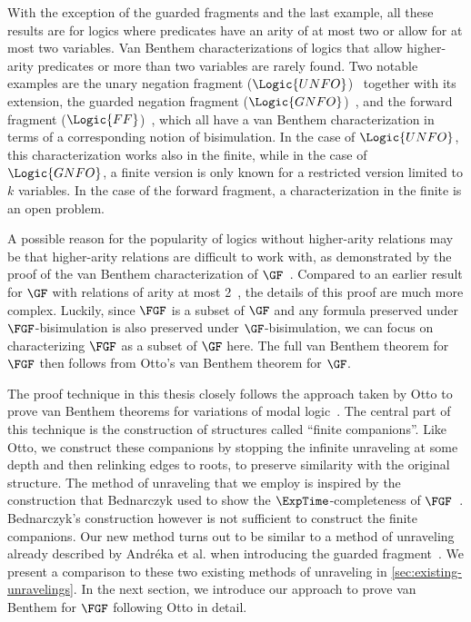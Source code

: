 With the exception of the guarded fragments and the last example, all these results are for logics where predicates have an arity of at most two or allow for at most two variables.
Van Benthem characterizations of logics that allow higher-arity predicates or more than two variables are rarely found.
Two notable examples are the unary negation fragment ($\Logic{UNFO}$)~\cite{segoufin2013} together with its extension, the guarded negation fragment ($\Logic{GNFO}$)~\cite{barany2015}, and the forward fragment ($\Logic{FF}$)~\cite{BednarczykJ22}, which all have a van Benthem characterization in terms of a corresponding notion of bisimulation.
In the case of $\Logic{UNFO}$, this characterization works also in the finite, while in the case of $\Logic{GNFO}$, a finite version is only known for a restricted version limited to $k$ variables.
In the case of the forward fragment, a characterization in the finite is an open problem.

A possible reason for the popularity of logics without higher-arity relations may be that higher-arity relations are difficult to work with, as demonstrated by the proof of the van Benthem characterization of $\GF$~\cite{Otto2012}.
Compared to an earlier result for $\GF$ with relations of arity at most 2~\cite{Otto04}, the details of this proof are much more complex.
Luckily, since $\FGF$ is a subset of $\GF$ and any formula preserved under $\FGF$-bisimulation is also preserved under $\GF$-bisimulation, we can focus on characterizing $\FGF$ as a subset of $\GF$ here.
The full van Benthem theorem for $\FGF$ then follows from Otto's van Benthem theorem for $\GF$.

The proof technique in this thesis closely follows the approach taken by Otto to prove van Benthem theorems for variations of modal logic~\cite{Otto04, otto2004a}.
The central part of this technique is the construction of structures called ``finite companions''.
Like Otto, we construct these companions by stopping the infinite unraveling at some depth and then relinking edges to roots, to preserve similarity with the original structure.
The method of unraveling that we employ is inspired by the construction that Bednarczyk used to show the $\ExpTime$-completeness of $\FGF$~\cite{Bednarczyk21}.
Bednarczyk's construction however is not sufficient to construct the finite companions.
Our new method turns out to be similar to a method of unraveling already described by Andréka et al. when introducing the guarded fragment~\cite{AndrekaNB98}.
We present a comparison to these two existing methods of unraveling in \cref{sec:existing-unravelings}.
In the next section, we introduce our approach to prove van Benthem for $\FGF$ following Otto in detail.

